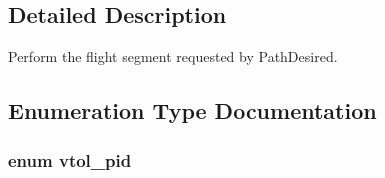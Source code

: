 \subsection{Detailed Description}
Perform the flight segment requested by Path\-Desired. 

\subsection{Enumeration Type Documentation}
\hypertarget{group___vtol_path_follower_gaa1cc793c473ad52ad906c7feecdb3a37}{
\subsubsection[{vtol\-\_\-pid}]{\setlength{\rightskip}{0pt plus 5cm}enum {\bf vtol\-\_\-pid}}}\label{group___vtol_path_follower_gaa1cc793c473ad52ad906c7feecdb3a37}
